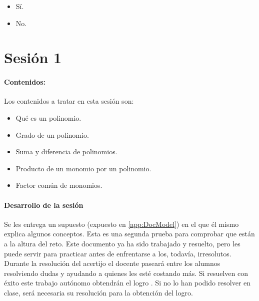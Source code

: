\begin{itemize}
	\item {} Sí.
	\item No.
\end{itemize}




\section{Sesión 1}


\paragraph{Contenidos:}
Los contenidos a tratar en esta sesión son:
\begin{itemize}
\item Qué es un polinomio.
\item Grado de un polinomio.
\item Suma y diferencia de polinomios.
\item Producto de un monomio por un polinomio.
\item Factor común de monomios.
\end{itemize}


\paragraph{Desarrollo de la sesión} 

Se les entrega un supuesto  (expuesto en \ref{app:DocModel}) en el que él mismo explica algunos conceptos.
%
Esta es una segunda prueba para comprobar que están a la altura del reto.
%
Este documento ya ha sido trabajado y resuelto, pero les puede servir para practicar antes de enfrentarse a los, todavía, irresolutos.
%
Durante la resolución del acertijo el docente paseará entre los alumnos resolviendo dudas y ayudando a quienes les esté costando más. 
%
Si resuelven con éxito este trabajo autónomo obtendrán el logro .
%
Si no lo han podido resolver en clase, será necesaria su resolución para la obtención del logro.

